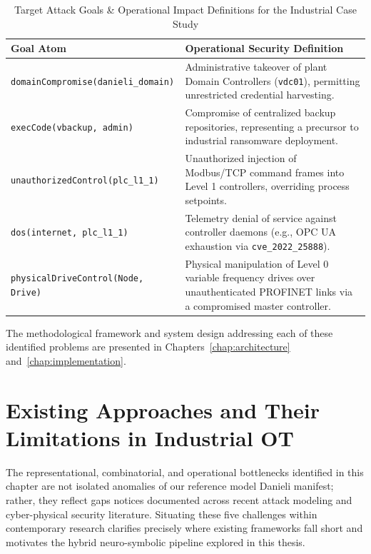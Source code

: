 \documentclass[target=mst,aauheader=aics,style=]{thud}
\begin{document}
\begin{table}[htbp]
\centering
\small
\caption{Target Attack Goals \& Operational Impact Definitions for the Industrial Case Study}
\label{tab:attack_goals}
\begin{tabularx}{\textwidth}{lY}
\toprule
\textbf{Goal Atom} & \textbf{Operational Security Definition} \\
\midrule
\texttt{domainCompromise(danieli\_domain)} & Administrative takeover of plant Domain Controllers (\texttt{vdc01}), permitting unrestricted credential harvesting. \\
\addlinespace
\texttt{execCode(vbackup, admin)} & Compromise of centralized backup repositories, representing a precursor to industrial ransomware deployment. \\
\addlinespace
\texttt{unauthorizedControl(plc\_l1\_1)} & Unauthorized injection of Modbus/TCP command frames into Level 1 controllers, overriding process setpoints. \\
\addlinespace
\texttt{dos(internet, plc\_l1\_1)} & Telemetry denial of service against controller daemons (e.g., OPC UA exhaustion via \texttt{cve\_2022\_25888}). \\
\addlinespace
\texttt{physicalDriveControl(Node, Drive)} & Physical manipulation of Level 0 variable frequency drives over unauthenticated PROFINET links via a compromised master controller. \\
\bottomrule
\end{tabularx}
\end{table}

The methodological framework and system design addressing each of these identified problems are presented in Chapters~\ref{chap:architecture} and~\ref{chap:implementation}.

\section{Existing Approaches and Their Limitations in Industrial OT}
\label{sec:existing_solutions_limitations} 

The representational, combinatorial, and operational bottlenecks identified in this chapter are not isolated anomalies of our reference model Danieli manifest; rather, they reflect gaps notices documented across recent attack modeling and cyber-physical security literature. Situating these five challenges within contemporary research clarifies precisely where existing frameworks fall short and motivates the hybrid neuro-symbolic pipeline explored in this thesis.
\end{document}

